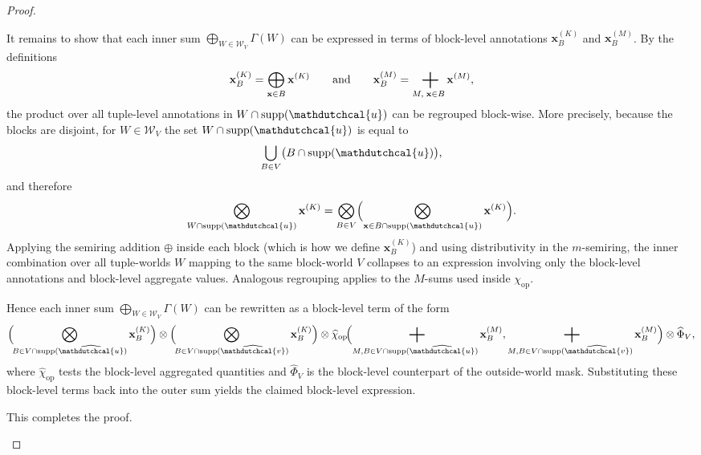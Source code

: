 \begin{proof}
\begin{enumerate}
It remains to show that each inner sum $\bigoplus_{W\in\mathcal{W}_V}\Gamma(W)$ can be expressed in terms of block-level annotations
$\mathbf{x}_B^{(K)}$ and $\mathbf{x}_B^{(M)}$. By the definitions
\[
\mathbf{x}_B^{(K)}=\bigoplus_{\mathbf{x}\in B}\mathbf{x}^{(K)}
\qquad\text{and}\qquad
\mathbf{x}_B^{(M)}=\bigplus_{M,\;\mathbf{x}\in B}\mathbf{x}^{(M)},
\]
the product over all tuple-level annotations in $W\cap\mathrm{supp}(\mathdutchcal{u})$
can be regrouped block-wise. More precisely, because the blocks are disjoint,
for $W\in\mathcal{W}_V$ the set $W\cap\mathrm{supp}(\mathdutchcal{u})$ is equal to
\[
\bigcup_{B\in V}\bigl(B\cap\mathrm{supp}(\mathdutchcal{u})\bigr),
\]
and therefore
\[
\bigotimes_{W\cap\mathrm{supp}(\mathdutchcal{u})}\mathbf{x}^{(K)}
=
\bigotimes_{B\in V}
  \Bigl(\bigotimes_{\mathbf{x}\in B\cap\mathrm{supp}(\mathdutchcal{u})}\mathbf{x}^{(K)}\Bigr).
\]
Applying the semiring addition $\oplus$ inside each block (which is how we define $\mathbf{x}_B^{(K)}$)
and using distributivity in the $m$-semiring,
the inner combination over all tuple-worlds $W$ mapping to the same block-world $V$ collapses to an expression
involving only the block-level annotations and block-level aggregate values.
Analogous regrouping applies to the $M$-sums used inside $\chi_{\mathrm{op}}$.

Hence each inner sum $\bigoplus_{W\in\mathcal{W}_V}\Gamma(W)$ can be rewritten as a block-level term of the form
\[
\Bigl(\!\bigotimes_{B\in V\cap\mathrm{supp}(\widehat{\mathdutchcal{u}})} \mathbf{x}_B^{(K)}\Bigr)
\otimes
\Bigl(\!\bigotimes_{B\in V\cap\mathrm{supp}(\widehat{\mathdutchcal{v}})} \mathbf{x}_B^{(K)}\Bigr)
\otimes
\widehat{\chi}_{\mathrm{op}}\!\Bigl(\bigplus_{M,B\in V\cap\mathrm{supp}(\widehat{\mathdutchcal{u}})}\mathbf{x}_B^{(M)},
                                \bigplus_{M,B\in V\cap\mathrm{supp}(\widehat{\mathdutchcal{v}})}\mathbf{x}_B^{(M)}\Bigr)
\otimes
\widehat{\Phi}_{V},
\]
where $\widehat{\chi}_{\mathrm{op}}$ tests the block-level aggregated quantities and $\widehat{\Phi}_{V}$
is the block-level counterpart of the outside-world mask. Substituting these block-level terms back into the outer sum yields the claimed block-level expression.

This completes the proof.

\end{enumerate}
\end{proof}

